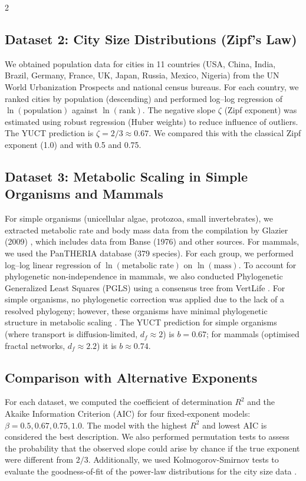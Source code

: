 \documentclass[11pt,a4paper]{article}
\newcommand{\df}{d_f}
\begin{document}
\begin{multicols}{2}
		\subsection{Dataset 2: City Size Distributions (Zipf's Law)}
		
		We obtained population data for cities in 11 countries (USA, China, India, Brazil, Germany, France, UK, Japan, Russia, Mexico, Nigeria) from the UN World Urbanization Prospects \cite{UN2018} and national census bureaus. For each country, we ranked cities by population (descending) and performed log–log regression of \(\ln(\text{population})\) against \(\ln(\text{rank})\). The negative slope \(\zeta\) (Zipf exponent) was estimated using robust regression (Huber weights) to reduce influence of outliers. The YUCT prediction is \(\zeta = 2/3 \approx 0.67\). We compared this with the classical Zipf exponent (1.0) and with 0.5 and 0.75.
		
		\subsection{Dataset 3: Metabolic Scaling in Simple Organisms and Mammals}
		
		For simple organisms (unicellular algae, protozoa, small invertebrates), we extracted metabolic rate and body mass data from the compilation by Glazier (2009) \cite{Glazier2009}, which includes data from Banse (1976) \cite{Banse1976} and other sources. For mammals, we used the PanTHERIA database \cite{PanTHERIA} (379 species). For each group, we performed log–log linear regression of \(\ln(\text{metabolic rate})\) on \(\ln(\text{mass})\). To account for phylogenetic non-independence in mammals, we also conducted Phylogenetic Generalized Least Squares (PGLS) using a consensus tree from VertLife \cite{VertLife}. For simple organisms, no phylogenetic correction was applied due to the lack of a resolved phylogeny; however, these organisms have minimal phylogenetic structure in metabolic scaling \cite{Glazier2005}. The YUCT prediction for simple organisms (where transport is diffusion-limited, \(\df \approx 2\)) is \(b = 0.67\); for mammals (optimised fractal networks, \(\df \approx 2.2\)) it is \(b \approx 0.74\).
		
		\subsection{Comparison with Alternative Exponents}
		
		For each dataset, we computed the coefficient of determination \(R^2\) and the Akaike Information Criterion (AIC) for four fixed-exponent models: \(\beta = 0.5, 0.67, 0.75, 1.0\). The model with the highest \(R^2\) and lowest AIC is considered the best description. We also performed permutation tests to assess the probability that the observed slope could arise by chance if the true exponent were different from \(2/3\). Additionally, we used Kolmogorov-Smirnov tests to evaluate the goodness-of-fit of the power-law distributions for the city size data \cite{Clauset2009}.
		

\end{multicols}
\end{document}
